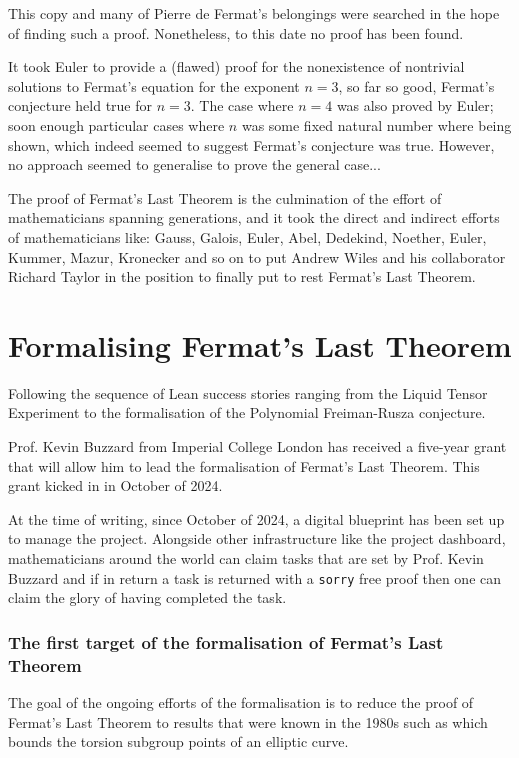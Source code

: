 This copy and many of Pierre de Fermat's belongings were searched in the hope of finding such a proof. Nonetheless, to this date no proof has been found.


It took Euler to provide a (flawed) proof for the nonexistence of nontrivial solutions to Fermat's equation for the exponent $n = 3$, so far so good, Fermat's conjecture held true for $n = 3$.
The case where $n = 4$ was also proved by Euler; soon enough particular cases where $n$ was some fixed natural number where being shown, which indeed seemed to suggest Fermat's conjecture was true.
However, no approach seemed to generalise to prove the general case...

The proof of Fermat's Last Theorem is the culmination of the effort of mathematicians spanning generations, and it took the direct and indirect efforts of mathematicians like: 
Gauss, Galois, Euler, Abel, Dedekind, Noether, Euler, Kummer, Mazur, Kronecker and so on to put Andrew Wiles and his collaborator Richard Taylor in the position 
to finally put to rest Fermat's Last Theorem.


\section{Formalising Fermat's Last Theorem}

Following the sequence of Lean success stories ranging from the Liquid Tensor Experiment to the formalisation of the Polynomial Freiman-Rusza conjecture. 

Prof. Kevin Buzzard from Imperial College London has received a five-year grant that will allow him to lead the formalisation of Fermat's Last Theorem. This grant kicked in in October of 2024. 

At the time of writing, since October of 2024, a digital blueprint has been set up to manage the project. Alongside other infrastructure like the project dashboard, mathematicians around the world can 
claim tasks that are set by Prof. Kevin Buzzard and if in return a task is returned with a \texttt{sorry} free proof then one can claim the glory of having completed the task.

\subsubsection{The first target of the formalisation of Fermat's Last Theorem}

The goal of the ongoing efforts of the formalisation is to reduce the proof of Fermat's Last Theorem to results that were known in the 1980s such as  
which bounds the torsion subgroup points of an elliptic curve.

